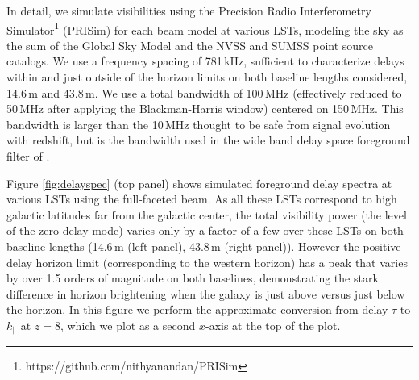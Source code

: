 In detail, we simulate visibilities using the Precision Radio Interferometry Simulator\footnote{https://github.com/nithyanandan/PRISim} (PRISim) for each beam model at various LSTs, modeling the sky as the sum of the Global Sky Model \citep{gsm} and the NVSS \citep{nvss} and SUMSS \citep{sumss,sumss2} point source catalogs. We use a frequency spacing of 781\,kHz, sufficient to characterize delays within and just outside of the horizon limits on both baseline lengths considered, 14.6\,m and 43.8\,m. We use a total bandwidth of 100\,MHz (effectively reduced to 50\,MHz after applying the Blackman-Harris window) centered on 150\,MHz. This bandwidth is larger than the 10\,MHz thought to be safe from signal evolution with redshift, but is the bandwidth used in the wide band delay space foreground filter of \citet{parsons14,ali15}.

Figure \ref{fig:delayspec} (top panel) shows simulated foreground delay spectra at various LSTs using the full-faceted beam. As all these LSTs correspond to high galactic latitudes far from the galactic center, the total visibility power (the level of the zero delay mode) varies only by a factor of a few over these LSTs on both baseline lengths (14.6\,m (left panel), 43.8\,m (right panel)). However the positive delay horizon limit (corresponding to the western horizon) has a peak that varies by over 1.5 orders of magnitude on both baselines, demonstrating the stark difference in horizon brightening when the galaxy is just above versus just below the horizon. In this figure we perform the approximate conversion from delay $\tau$ to $k_\parallel$ at $z=8$, which we plot as a second $x$-axis at the top of the plot. 

